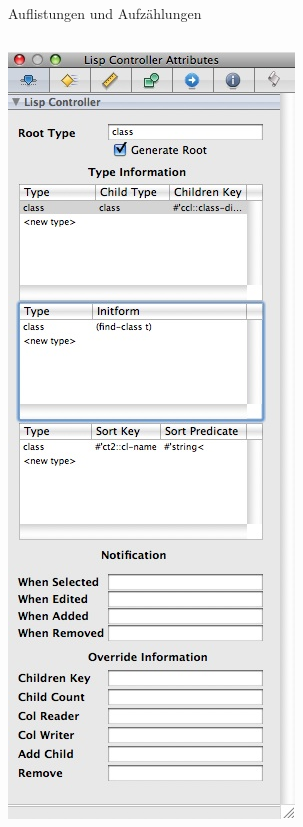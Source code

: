 \documentclass[utf8]{beamer}
\begin{document}
\begin{frame}{Auflistungen und Aufz\"ahlungen}
\begin{columns}[T]
	\includegraphics[width=\textwidth]{Controller13}

	\end{columns}
\end{frame}
\end{document}
